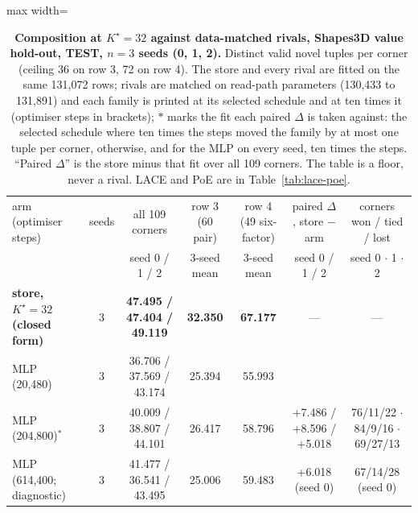 \documentclass{article} %
\newcommand{\Kstar}{\ensuremath{K^{\star}}}
\begin{document}
\begin{table}[t]
\centering\small
\caption{\textbf{Composition at $\Kstar=32$ against data-matched rivals, Shapes3D value hold-out, TEST, $n=3$
seeds (0, 1, 2).} Distinct valid novel tuples per corner (ceiling 36 on row 3, 72 on row 4). The store %
and every rival are fitted on the same 131,072 rows; rivals are matched on read-path parameters %
(130,433 to 131,891) and each family is printed at its selected schedule and at ten times it %
(optimiser steps in brackets); $\ast$ marks the fit each paired $\Delta$ is taken against: the
selected schedule where ten times the steps moved the family by at most one tuple per corner,
otherwise, and for the MLP on every seed, ten times the steps. ``Paired $\Delta$'' is the store minus
that fit over all 109 corners. The table is a floor, never a rival. LACE and PoE are in %
Table~\ref{tab:lace-poe}.}
\label{tab:t7}
\setlength{\tabcolsep}{3pt}
\begin{adjustbox}{max width=\linewidth}\begin{tabular}{lcccccc}
\toprule
arm (optimiser steps) & seeds & all 109 corners & row 3 (60 pair) & row 4 (49 six-factor) & paired $\Delta$, store $-$ arm & corners won / tied / lost \\ %
 & & seed 0 / 1 / 2 & 3-seed mean & 3-seed mean & seed 0 / 1 / 2 & seed 0 $\cdot$ 1 $\cdot$ 2 \\
\midrule
\textbf{store, $\Kstar=32$ (closed form)} & 3 & \textbf{47.495 / 47.404 / 49.119} & \textbf{32.350} & \textbf{67.177} & --- & --- \\
MLP (20,480) & 3 & 36.706 / 37.569 / 43.174 & 25.394 & 55.993 & & \\
MLP (204,800)$^\ast$ & 3 & 40.009 / 38.807 / 44.101 & 26.417 & 58.796 & +7.486 / +8.596 / +5.018 & 76/11/22 $\cdot$ 84/9/16 $\cdot$ 69/27/13 \\
MLP (614,400; diagnostic) & 3 & 41.477 / 36.541 / 43.495 & 25.006 & 59.483 & +6.018 (seed 0) & 67/14/28 (seed 0) \\

\end{tabular}
\end{adjustbox}
\end{table}
\end{document}

